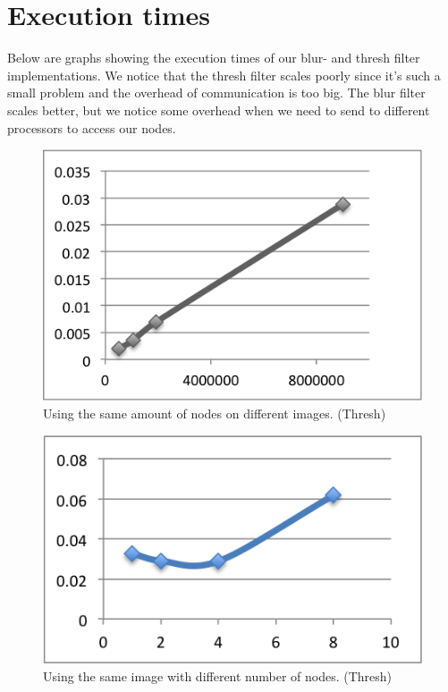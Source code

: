 \documentclass[a4paper]{article}
\begin{document}
\section{Execution times}

Below are graphs showing the execution times of our blur- and thresh
filter implementations. We notice that the thresh filter scales poorly
since it\rq{}s such a small problem and the overhead of communication is
too big. The blur filter scales better, but we notice some overhead when
we need to send to different processors to access our nodes.

\begin{figure}
  \centering
  \includegraphics{sameProcessors.png}
  \caption{Using the same amount of nodes on different images. (Thresh)}
  \label{tab:fig1}
\end{figure}

\begin{figure}
  \centering
  \includegraphics{samePixels.png}
  \caption{Using the same image with different number of nodes. (Thresh)}
  \label{tab:fig2}
\end{figure}
\end{document}
